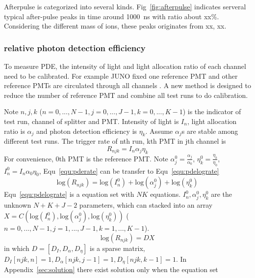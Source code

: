 Afterpulse is categorized into several kinds. Fig~\ref{fig:afterpulse} indicates serveral typical after-pulse peaks in time around \SI{1000}{ns} with ratio about xx\%. Considering the different mass of ions, these peaks originates from xx, xx.
\subsubsection{relative photon detection efficiency}
To measure PDE, the intensity of light and light allocation ratio of each channel need to be calibrated. For example JUNO fixed one reference PMT and other reference PMTs are circulated through all channels \cite{Wonsak_2021}. A new method is designed to reduce the number of reference PMT and combine all test runs to do calibration.  

Note $n,j,k$ ($n=0,...,N-1, j=0,...,J-1, k=0,...,K-1$) is the indicator of test run, channel of splitter and PMT. Intensity of light is $I_n$, light allocation ratio is $\alpha_j$ and photon detection efficiency is $\eta_k$. Assume $\alpha_j$s are stable among different test runs. The trigger rate of nth run, kth PMT in jth channel is
\begin{equation}
    \label{equ:pderate}
    R_{njk}=I_n\alpha_j\eta_k
\end{equation}
For convenience, 0th PMT is the reference PMT. Note $\alpha_j^0=\frac{\alpha_j}{\alpha_0}$, $\eta_k^0=\frac{\eta_k}{\eta_0}$, $I_n^0=I_n\alpha_0\eta_0$, Equ~\eqref{equ:pderate} can be transfer to Equ~\eqref{equ:pdelograte}
\begin{equation}
    \label{equ:pdelograte}
    \mathrm{log}(R_{njk})=\mathrm{log}(I_n^0)+\mathrm{log}(\alpha_j^0)+\mathrm{log}(\eta_k^0)
\end{equation}
Equ~\eqref{equ:pdelograte} is a equation set with $NK$ equations. $I_n^0,\alpha_j^0,\eta_k^0$ are the unknown $N+K+J-2$ parameters, which can stacked into an array $X = C(\mathrm{log}(I_n^0), \mathrm{log}(\alpha_j^0),\mathrm{log}(\eta_k^0))$ ($n=0,...,N-1, j=1,...,J-1, k=1,...,K-1$). 
\begin{equation}
    \mathrm{log}(R_{njk})=DX
\end{equation}
in which $D=[D_I,D_\alpha, D_\eta]$ is a sparse matrix, $D_I[{njk},n]=1,D_\alpha[{njk},j-1]=1, D_\eta[{njk},k-1]=1$. 
In Appendix~\ref{sec:solution} there exist solution only when the  equation set